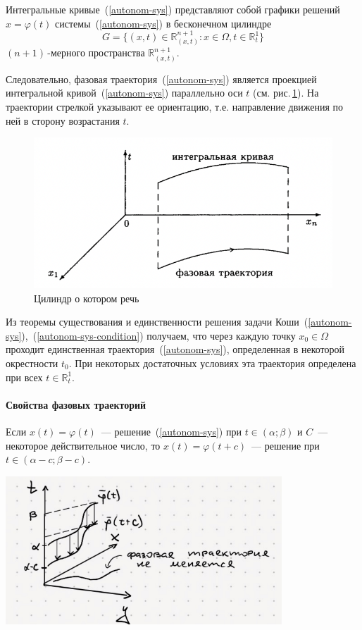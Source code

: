 Интегральные кривые~(\ref{autonom-sys}) представляют собой графики решений \(x = \varphi(t)\) системы~(\ref{autonom-sys}) в бесконечном цилиндре
\[G = \{(x, t) \in \mathbb{R}_{(x, t)}^{n + 1} : x \in \Omega, t \in \mathbb{R}_t^1\}\]
\((n + 1)\)\,-мерного пространства $\mathbb{R}_{(x, t)}^{n + 1}$. 

Следовательно, фазовая траектория~(\ref{autonom-sys}) является проекцией интегральной кривой~(\ref{autonom-sys}) параллельно оси $t$ (см. рис.\,\ref{fkng-cylinder}). На траектории стрелкой указывают ее ориентацию, т.е. направление движения по ней в сторону возрастания $t$.

\begin{figure}[ht]\label{fkng-cylinder}
    \centering
    \includegraphics[scale=0.8]{sections/Sasha/images/fkng-cylinder.png}
    \caption{Цилиндр о котором речь}
\end{figure}

Из теоремы существования и единственности решения задачи Коши~(\ref{autonom-sys}),~(\ref{autonom-sys-condition}) получаем, что через каждую точку \(x_0 \in \Omega\) проходит единственная траектория~(\ref{autonom-sys}), определенная в некоторой окрестности $t_0$. При некоторых
достаточных условиях эта траектория определена при всех \(t \in \mathbb{R}_t^1\).

\paragraph{Свойства фазовых траекторий}

\begin{theorem}[очев]
Если \(x(t) = \varphi(t)\)~--- решение~(\ref{autonom-sys}) при \(t \in (\alpha ; \beta)\) и $C$~--- некоторое действительное число, то \(x(t) = \varphi(t + c)\)~--- решение при \(t \in (\alpha - c; \beta - c)\).
\end{theorem}
\begin{center}
    \includegraphics[width=0.5\linewidth]{images/proof.png}
\end{center}

